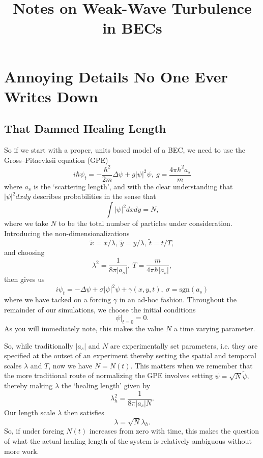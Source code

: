 \documentclass[a4paper,11pt]{article}
\title{Notes on Weak-Wave Turbulence in BECs}
\date{}
\begin{document}
\maketitle
\section*{Annoying Details No One Ever Writes Down}
\subsection*{That Damned Healing Length}
So if we start with a proper, units based model of a BEC, we need to use the Gross--Pitaevksii equation (GPE)
\[
i\hbar\psi_{t} = -\frac{\hbar^{2}}{2m}\Delta \psi + g\left| \psi\right|^{2}\psi, ~ g = \frac{4\pi \hbar^{2}a_{s}}{m}
\]
where $a_{s}$ is the `scattering length', and with the clear understanding that $\left|\psi\right|^{2}dxdy$ describes probabilities in the sense that 
\[
\int |\psi|^{2}dxdy = N,
\]
where we take $N$ to be the total number of particles under consideration.  Introducing the non-dimensionalizations 
\[
\tilde{x} = x/\lambda, ~ \tilde{y} = y/\lambda, ~ \tilde{t} = t/T, 
\]
and choosing
\[
\lambda^{2} = \frac{1}{8\pi |a_{s}|}, ~ T = \frac{m}{4\pi\hbar |a_{s}|}, 
\] 
then gives us
\[
i\psi_{t} = -\Delta \psi + \sigma\left| \psi\right|^{2}\psi + \gamma(x,y,t),  ~\sigma = \mbox{sgn}(a_{s})
\]
where we have tacked on a forcing $\gamma$ in an ad-hoc fashion.  Throughout the remainder of our simulations, we choose the initial conditions
\[
\left.\psi\right|_{t=0} = 0.
\]
As you will immediately note, this makes the value $N$ a time varying parameter.  

So, while traditionally $|a_{s}|$ and $N$ are experimentally set parameters, i.e. they are specified at the outset of an experiment thereby setting the spatial and temporal scales $\lambda$ and $T$, now we have $N=N(t)$.  This matters when we remember that the more traditional route of normalizing the GPE involves setting $\psi = \sqrt{N}\tilde{\psi}$, thereby making $\lambda$ the `healing length' given by 
\[
\lambda^{2}_{h} = \frac{1}{8\pi |a_{s}|N}. 
\] 
Our length scale $\lambda$ then satisfies 
\[
\lambda = \sqrt{N}\lambda_{h}.
\]
So, if under forcing $N(t)$ increases from zero with time, this makes the question of what the actual healing length of the system is relatively ambiguous without more work.  
\end{document}
